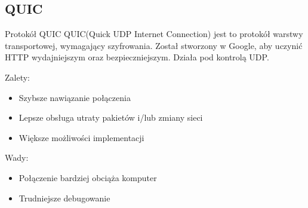 \documentclass{beamer}
\begin{document}
\subsection{QUIC}
\begin{frame}{Protokół QUIC}
    QUIC(Quick UDP Internet Connection) jest to protokół warstwy transportowej, wymagający szyfrowania. Został stworzony w Google, aby uczynić HTTP wydajniejszym oraz bezpieczniejszym. Działa pod kontrolą UDP.
    
    \vspace{20pt}
    \begin{large}
    Zalety:
    \end{large}
    \begin{itemize}
        \item Szybsze nawiązanie połączenia
        \item Lepsze obsługa utraty pakietów i/lub zmiany sieci
        \item Większe możliwości implementacji
    \end{itemize}
    
    \pause
    
    \begin{large}
    Wady:
    \end{large}
    \begin{itemize}
        \item Połączenie bardziej obciąża komputer
        \item Trudniejsze debugowanie
    \end{itemize}
    
\end{frame}
\end{document}
